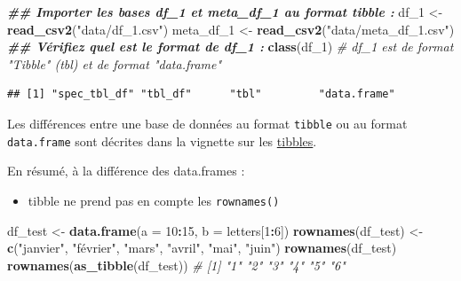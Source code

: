 \documentclass[
]{book}
\newenvironment{Shaded}{\begin{snugshade}}{\end{snugshade}}
\newcommand{\AttributeTok}[1]{\textcolor[rgb]{0.13,0.29,0.53}{#1}}
\newcommand{\CommentTok}[1]{\textcolor[rgb]{0.56,0.35,0.01}{\textit{#1}}}
\newcommand{\DecValTok}[1]{\textcolor[rgb]{0.00,0.00,0.81}{#1}}
\newcommand{\DocumentationTok}[1]{\textcolor[rgb]{0.56,0.35,0.01}{\textbf{\textit{#1}}}}
\newcommand{\FunctionTok}[1]{\textcolor[rgb]{0.13,0.29,0.53}{\textbf{#1}}}
\newcommand{\NormalTok}[1]{#1}
\newcommand{\OtherTok}[1]{\textcolor[rgb]{0.56,0.35,0.01}{#1}}
\newcommand{\SpecialCharTok}[1]{\textcolor[rgb]{0.81,0.36,0.00}{\textbf{#1}}}
\newcommand{\StringTok}[1]{\textcolor[rgb]{0.31,0.60,0.02}{#1}}
\providecommand{\tightlist}{%
  \setlength{\itemsep}{0pt}\setlength{\parskip}{0pt}}
\begin{document}
\begin{Shaded}
\begin{Highlighting}[]
\DocumentationTok{\#\# Importer les bases df\_1 et meta\_df\_1 au format tibble :}
\NormalTok{df\_1 }\OtherTok{\textless{}{-}} \FunctionTok{read\_csv2}\NormalTok{(}\StringTok{"data/df\_1.csv"}\NormalTok{)}
\NormalTok{meta\_df\_1 }\OtherTok{\textless{}{-}} \FunctionTok{read\_csv2}\NormalTok{(}\StringTok{"data/meta\_df\_1.csv"}\NormalTok{)}
\DocumentationTok{\#\# Vérifiez quel est le format de df\_1 :}
\FunctionTok{class}\NormalTok{(df\_1) }\CommentTok{\# df\_1 est de format "Tibble" (tbl) et de format "data.frame"}
\end{Highlighting}
\end{Shaded}

\begin{verbatim}
## [1] "spec_tbl_df" "tbl_df"      "tbl"         "data.frame"
\end{verbatim}

Les différences entre une base de données au format \texttt{tibble} ou au format \texttt{data.frame} sont décrites dans la vignette sur les \href{https://tibble.tidyverse.org/articles/tibble.html}{tibbles}.

En résumé, à la différence des data.frames :

\begin{itemize}
\tightlist
\item
  tibble ne prend pas en compte les \texttt{rownames()}
\end{itemize}

\begin{Shaded}
\begin{Highlighting}[]
\NormalTok{df\_test }\OtherTok{\textless{}{-}} \FunctionTok{data.frame}\NormalTok{(}\AttributeTok{a =} \DecValTok{10}\SpecialCharTok{:}\DecValTok{15}\NormalTok{, }\AttributeTok{b =}\NormalTok{ letters[}\DecValTok{1}\SpecialCharTok{:}\DecValTok{6}\NormalTok{])}
\FunctionTok{rownames}\NormalTok{(df\_test) }\OtherTok{\textless{}{-}} \FunctionTok{c}\NormalTok{(}\StringTok{"janvier"}\NormalTok{, }\StringTok{"février"}\NormalTok{, }\StringTok{"mars"}\NormalTok{, }\StringTok{"avril"}\NormalTok{, }\StringTok{"mai"}\NormalTok{, }\StringTok{"juin"}\NormalTok{)}
\FunctionTok{rownames}\NormalTok{(df\_test)}
\FunctionTok{rownames}\NormalTok{(}\FunctionTok{as\_tibble}\NormalTok{(df\_test)) }\CommentTok{\# [1] "1" "2" "3" "4" "5" "6"}
\end{Highlighting}
\end{Shaded}
\end{document}
